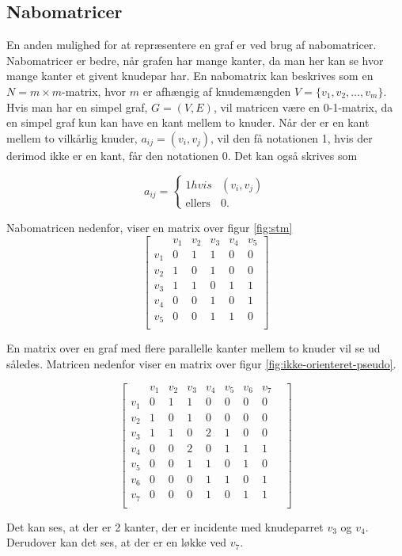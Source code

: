 \subsection{Nabomatricer}
En anden mulighed for at repræsentere en graf er ved brug af nabomatricer. Nabomatricer er bedre, når grafen har mange kanter, da man her kan se hvor mange kanter et givent knudepar har.
En nabomatrix kan beskrives som en $N=m \times m$-matrix, hvor $m$ er afhængig af knudemængden $V=\{v_1, v_2, \ldots, v_m\}$. Hvis man har en simpel graf, $G=(V,E)$, vil matricen være en 0-1-matrix, da en simpel graf kun kan have en kant mellem to knuder. Når der er en kant mellem to  vilkårlig knuder, $a_{ij}=(v_i,v_j)$,  vil den få notationen 1, hvis der derimod ikke er en kant, får den notationen 0.
Det kan også skrives som

\[ a_{ij} = \left\{ \begin{array}{ll}
         1  hvis & (v_i, v_j)\\
         \mbox{ellers} & 0.\end{array} \right. \]


Nabomatricen nedenfor, viser en matrix over figur \ref{fig:stm}
\begin{equation}
	\begin{bmatrix}
		&v_1&v_2&v_3&v_4&v_5 \\
		v_1&0&1&1&0&0 \\
		v_2&1&0&1&0&0 \\
		v_3&1&1&0&1&1 \\
		v_4&0&0&1&0&1 \\
		v_5&0&0&1&1&0 \\
	\end{bmatrix}
\end{equation}

En matrix over en graf med flere parallelle kanter mellem to knuder vil se ud således. Matricen nedenfor viser en matrix over figur \ref{fig:ikke-orienteret-pseudo}.

\begin{equation}
	\begin{bmatrix}
	&v_1&v_2&v_3&v_4&v_5&v_6&v_7& \\
	v_1&0&1&1&0&0&0&0 \\
	v_2&1&0&1&0&0&0&0 \\
	v_3&1&1&0&2&1&0&0 \\
	v_4&0&0&2&0&1&1&1 \\
	v_5&0&0&1&1&0&1&0 \\
	v_6&0&0&0&1&1&0&1 \\
	v_7&0&0&0&1&0&1&1 \\	
	\end{bmatrix}
\end{equation}

Det kan ses, at der er 2 kanter, der er incidente med knudeparret $v_3$ og $v_4$. Derudover kan det ses, at der er en løkke ved $v_7$.

